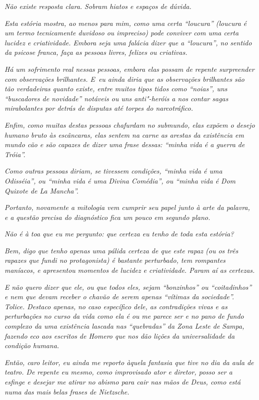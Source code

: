 \emph{Não existe resposta clara. Sobram hiatos e espaços de dúvida.}~

\emph{Esta estória mostra, ao menos para mim, como uma certa ``loucura''
(loucura é um termo tecnicamente duvidoso ou impreciso) pode conviver
com uma certa lucidez e criatividade. Embora seja uma falácia dizer que
a ``loucura'', no sentido da psicose franca, faça as pessoas livres,
felizes ou criativas.}~

\emph{Há um sofrimento real nessas pessoas, embora elas possam de
repente surpreender com observações brilhantes. E~eu ainda diria que as
observações brilhantes são tão verdadeiras quanto existe, entre muitos
tipos tidos como ``noias'', uns ``buscadores de novidade'' notáveis ou
uns anti"-heróis a nos contar sagas mirabolantes por detrás de disputas
até torpes do narcotráfico.}~

\emph{Enfim, como muitas destas pessoas chafurdam no submundo, elas
expõem o desejo humano bruto às escâncaras, elas sentem na carne as
arestas da existência em mundo cão e são capazes de dizer uma frase
dessas: ``minha vida é a guerra de Tróia''.}~

\emph{Como outras pessoas diriam, se tivessem condições, ``minha vida é
uma Odisséia'', ou ``minha vida é uma Divina Comédia'', ou ``minha vida
é Dom Quixote de La Mancha''.}~

\emph{Portanto, novamente a mitologia vem cumprir seu papel junto à arte
da palavra, e a questão precisa do diagnóstico fica um pouco em segundo
plano.}~

\emph{Não é à toa que eu me pergunto: que certeza eu tenho de toda esta
estória?}~

\emph{Bem, digo que tenho apenas uma pálida certeza de que este rapaz
(ou os três rapazes que fundi no protagonista) é bastante perturbado,
tem rompantes maníacos, e apresentou momentos de lucidez e criatividade.
Param aí as certezas.}

\emph{E não quero dizer que ele, ou que todos eles, sejam ``bonzinhos''
ou ``coitadinhos'' e nem que devam receber o chavão de serem apenas
``vítimas da sociedade''. Tolice. Destaco apenas, no caso específico
dele, as contradições vivas e as perturbações no curso da vida como ela
é ou me parece ser e no pano de fundo complexo da uma existência lascada
nas ``quebradas'' da Zona Leste de Sampa, fazendo eco aos escritos de
Homero que nos dão lições da universalidade da condição humana.}~

\emph{Então, caro leitor, eu ainda me reporto àquela fantasia que tive
no dia da aula de teatro. De repente eu mesmo, como improvisado ator e
diretor, posso ser a esfinge e desejar me atirar no abismo para cair nas
mãos de Deus, como está numa das mais belas frases de Nietzsche.}~

